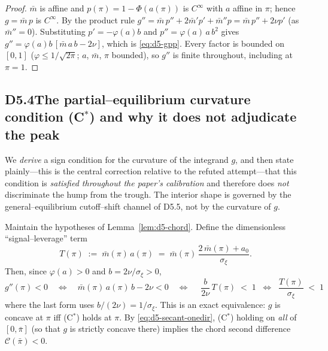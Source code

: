 \begin{proof}
$\bar m$ is affine and $p(\pi)=1-\Phi(a(\pi))$ is $C^\infty$ with $a$ affine in
$\pi$; hence $g=\bar m\,p$ is $C^\infty$. By the product rule $g''=\bar m\,p''+
2\bar m'p'+\bar m''p=\bar m\,p''+2\nu p'$ (as $\bar m''=0$). Substituting
$p'=-\varphi(a)b$ and $p''=\varphi(a)\,a\,b^2$ gives
$g''=\varphi(a)b\,[\bar m\,a\,b-2\nu]$, which is \eqref{eq:d5-gpp}. Every factor
is bounded on $[0,1]$ ($\varphi\le1/\sqrt{2\pi}$; $a$, $\bar m$, $\pi$
bounded), so $g''$ is finite throughout, including at $\pi=1$. %
\end{proof}

\subsection*{D5.4\quad The partial--equilibrium curvature condition (C$^\ast$)
and why it does not adjudicate the peak}

We \emph{derive} a sign condition for the curvature of the integrand $g$, and
then state plainly---this is the central correction relative to the refuted
attempt---that this condition is \emph{satisfied throughout the paper's
calibration} and therefore does \emph{not} discriminate the hump from the
trough. The interior shape is governed by the general--equilibrium cutoff--shift
channel of D5.5, not by the curvature of $g$.

\begin{lemma}\label{lem:d5-Cstar}
Maintain the hypotheses of Lemma~\ref{lem:d5-chord}. Define the dimensionless
``signal--leverage'' term
\begin{equation}\label{eq:d5-Tdef}
  T(\pi)\;:=\;\bar m(\pi)\,a(\pi)\;=\;\bar m(\pi)\,\frac{2\,\bar m(\pi)+a_0}{\sigma_\xi}.
\end{equation}
Then, since $\varphi(a)>0$ and $b=2\nu/\sigma_\xi>0$,
\begin{equation}\label{eq:d5-Cstar}
  g''(\pi)<0
  \quad\Longleftrightarrow\quad
  \bar m(\pi)\,a(\pi)\,b-2\nu<0
  \quad\Longleftrightarrow\quad
  \boxed{\;\frac{b}{2\nu}\,T(\pi)\;<\;1
       \;\;\Longleftrightarrow\;\;
       \frac{T(\pi)}{\sigma_\xi}\;<\;1\;}\tag{C$^\ast$}
\end{equation}
where the last form uses $b/(2\nu)=1/\sigma_\xi$. This is an exact
equivalence: $g$ is concave at $\pi$ iff (C$^\ast$) holds at $\pi$. By
\eqref{eq:d5-secant-onedir}, (C$^\ast$) holding on \emph{all} of
$[0,\bar\pi]$ (so that $g$ is strictly concave there) implies the chord second
difference $\mathcal C(\bar\pi)<0$.
\end{lemma}

